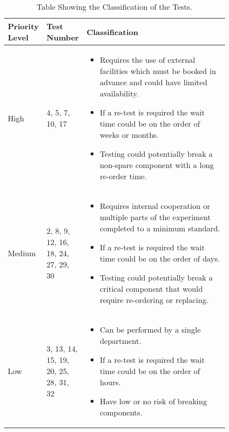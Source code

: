 \begin{table}[H]
\centering
\begin{tabular}{|p{0.1\linewidth}|p{0.1\linewidth}|p{0.7\linewidth}|}
\hline
\textbf{Priority Level} & \textbf{Test Number} & \textbf{Classification} \\ \hline
High & 4, 5, 7, 10, 17 & \begin{itemize}
    \item Requires the use of external facilities which must be booked in advance and could have limited availability.
    \item If a re-test is required the wait time could be on the order of weeks or months.
    \item Testing could potentially break a non-spare component with a long re-order time.
\end{itemize}\\ \hline
Medium & 2, 8, 9, 12, 16, 18, 24, 27, 29, 30 & \begin{itemize}
    \item Requires internal cooperation or multiple parts of the experiment completed to a minimum standard.
    \item If a re-test is required the wait time could be on the order of days.
    \item Testing could potentially break a critical component that would require re-ordering or replacing.
\end{itemize} \\ \hline
Low & 3, 13, 14, 15, 19, 20, 25, 28, 31, 32 & \begin{itemize}
    \item Can be performed by a single department.
    \item If a re-test is required the wait time could be on the order of hours.
    \item Have low or no risk of breaking components.
\end{itemize} \\ \hline
\end{tabular}
\caption{Table Showing the Classification of the Tests.}
\label{tab:classification}
\end{table}

\raggedbottom